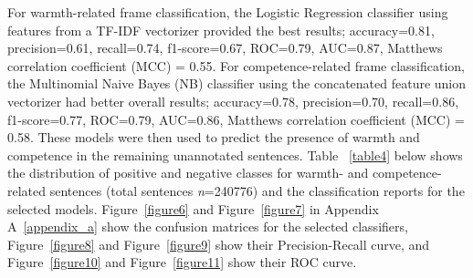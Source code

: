 \documentclass[jou]{apa7}
\begin{document}
For warmth-related frame classification, the Logistic Regression classifier using features from a TF-IDF vectorizer provided the best results; accuracy=0.81, precision=0.61, recall=0.74, f1-score=0.67, ROC=0.79, AUC=0.87, Matthews correlation coefficient (MCC) = 0.55. For competence-related frame classification, the Multinomial Naive Bayes (NB) classifier using the concatenated feature union vectorizer had better overall results; accuracy=0.78, precision=0.70, recall=0.86, f1-score=0.77, ROC=0.79, AUC=0.86, Matthews correlation coefficient (MCC) = 0.58. These models were then used to predict the presence of warmth and competence in the remaining unannotated sentences. Table ~\ref{table4} below shows the distribution of positive and negative classes for warmth- and competence-related sentences (total sentences \textit{n}=240776) and the classification reports for the selected models. Figure~\ref{figure6} and Figure~\ref{figure7} in Appendix A~\ref{appendix_a} show the confusion matrices for the selected classifiers, Figure~\ref{figure8} and Figure~\ref{figure9} show their Precision-Recall curve, and Figure~\ref{figure10} and Figure~\ref{figure11} show their ROC curve.
\end{document}
